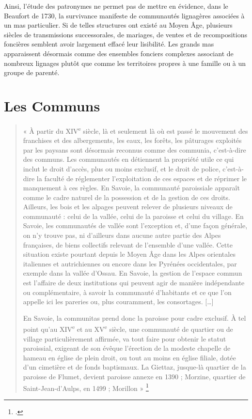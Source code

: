 \documentclass[12pt,a4paper]{report}
\begin{document}
Ainsi, l'étude des patronymes ne permet pas de mettre en évidence, dans le Beaufort de 1730, la survivance manifeste de communautés lignagères associées à un mas particulier. Si de telles structures ont existé au Moyen Âge, plusieurs siècles de transmissions successorales, de mariages, de ventes et de recompositions foncières semblent avoir largement effacé leur lisibilité. Les grands mas apparaissent désormais comme des ensembles fonciers complexes associant de nombreux lignages plutôt que comme les territoires propres à une famille ou à un groupe de parenté.

\section{Les Communs}

\begin{quote}
	« À partir du XIV\textsuperscript{e} siècle, là et seulement là où est passé le mouvement des franchises et des albergements, les eaux, les forêts, les pâturages exploités par les paysans sont désormais reconnus comme des communia, c’est-à-dire des communs. Les communautés en détiennent la propriété utile ce qui inclut le droit d’accès, plus ou moins exclusif, et le droit de police, c’est-à-dire la faculté de réglementer l’exploitation de ces espaces et de réprimer le manquement à ces règles. En Savoie, la communauté paroissiale apparaît comme le cadre naturel de la possession et de la gestion de ces droits. Ailleurs, les bois et les alpages peuvent relever de plusieurs niveaux de communauté : celui de la vallée, celui de la paroisse et celui du village. En Savoie, les communautés de vallée sont l’exception et, d’une façon générale, on n’y trouve pas, ni d’ailleurs dans aucune autre partie des Alpes françaises, de biens collectifs relevant de l’ensemble d’une vallée. Cette situation existe pourtant depuis le Moyen Âge dans les Alpes orientales italiennes et autrichiennes ou encore dans les Pyrénées occidentales, par exemple dans la vallée d’Ossau. En Savoie, la gestion de l’espace commun est l’affaire de deux institutions qui peuvent agir de manière indépendante ou complémentaire, à savoir la communauté d’habitants et ce que l’on appelle ici les pareries ou, plus couramment, les consortages. […]
	
	En Savoie, la communitas prend donc la paroisse pour cadre exclusif. À tel point qu’au XIV\textsuperscript{e} et au XV\textsuperscript{e} siècle, une communauté de quartier ou de village particulièrement affirmée, va tout faire pour obtenir le statut paroissial, exigeant de son évêque l’érection de la modeste chapelle de hameau en église de plein droit, ou tout au moins en église filiale, dotée d’un cimetière et de fonds baptismaux. La Giettaz, jusque-là quartier de la paroisse de Flumet, devient paroisse annexe en 1390 ; Morzine, quartier de Saint-Jean-d’Aulps, en 1499 ; Morillon »
	\footcite[85]{Mouthon2016}
\end{quote}
\end{document}

